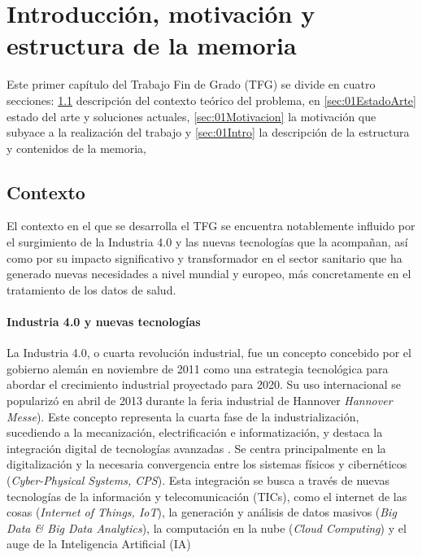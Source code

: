 \chapter{Introducción, motivación y estructura de la memoria}\label{cap:introduccion}

Este primer capítulo del Trabajo Fin de Grado (TFG) se divide en cuatro secciones: \ref{sec:01Contexto} descripción del contexto teórico del problema, en \ref{sec:01EstadoArte} estado del arte y soluciones actuales, \ref{sec:01Motivacion} la motivación que subyace a la realización del trabajo y \ref{sec:01Intro} la descripción de la estructura y contenidos de la memoria,

\section{Contexto} \label{sec:01Contexto} 

El contexto en el que se desarrolla el TFG se encuentra notablemente influido por el surgimiento de la Industria 4.0 y las nuevas tecnologías que la acompañan, así como por su impacto significativo y transformador en el sector sanitario que ha generado nuevas necesidades a nivel mundial y europeo, más concretamente en el tratamiento de los datos de salud. 


\subsubsection{Industria 4.0 y nuevas tecnologías}

La Industria 4.0, o cuarta revolución industrial, fue un concepto concebido por el gobierno alemán en noviembre de 2011 como una estrategia tecnológica para abordar el crecimiento industrial proyectado para 2020. Su uso internacional se popularizó en abril de 2013 durante la feria industrial de Hannover \textit{Hannover Messe}). Este concepto representa la cuarta fase de la industrialización, sucediendo a la mecanización, electrificación e informatización, y destaca la integración digital de tecnologías avanzadas \cite{lasi2014industry}.
Se centra principalmente en la digitalización y la necesaria convergencia entre los sistemas físicos y cibernéticos (\textit{Cyber-Physical Systems, CPS}). Esta integración se busca a través de nuevas tecnologías de la información y telecomunicación (TICs), como el internet de las cosas (\textit{Internet of Things, IoT}), la generación y análisis de datos masivos (\textit{Big Data \& Big Data Analytics}), la computación en la nube (\textit{Cloud Computing}) y el auge de la Inteligencia Artificial (IA) \cite{lasi2014industry, chen2020times, tortorella2020healthcare}

